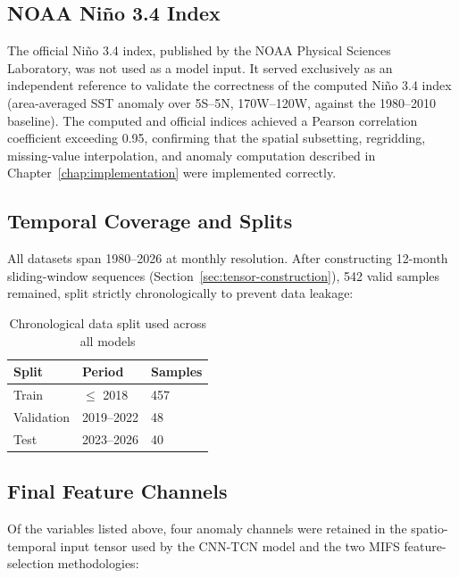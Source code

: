 \subsection*{NOAA Ni\~{n}o 3.4 Index}
The official Ni\~{n}o 3.4 index, published by the NOAA Physical Sciences Laboratory, was not used as a model input. It served exclusively as an independent reference to validate the correctness of the computed Ni\~{n}o 3.4 index (area-averaged SST anomaly over 5\degree S--5\degree N, 170\degree W--120\degree W, against the 1980--2010 baseline). The computed and official indices achieved a Pearson correlation coefficient exceeding 0.95, confirming that the spatial subsetting, regridding, missing-value interpolation, and anomaly computation described in Chapter~\ref{chap:implementation} were implemented correctly.

\subsection*{Temporal Coverage and Splits}
All datasets span 1980--2026 at monthly resolution. After constructing 12-month sliding-window sequences (Section~\ref{sec:tensor-construction}), 542 valid samples remained, split strictly chronologically to prevent data leakage:

\begin{table}[H]
\centering
\caption{Chronological data split used across all models}
\label{tab:dataset_split}
\normalsize
\renewcommand{\arraystretch}{1.2}
\begin{tabular}{|l|l|l|}
\hline
\textbf{Split} & \textbf{Period} & \textbf{Samples} \\
\hline
Train & $\leq$ 2018 & 457 \\
\hline
Validation & 2019--2022 & 48 \\
\hline
Test & 2023--2026 & 40 \\
\hline
\end{tabular}
\end{table}

\subsection*{Final Feature Channels}
Of the variables listed above, four anomaly channels were retained in the spatio-temporal input tensor used by the CNN-TCN model and the two MIFS feature-selection methodologies:

